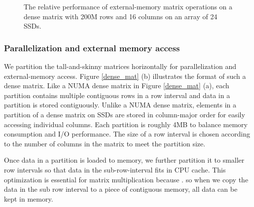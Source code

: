 \begin{figure}
	\begin{center}
		\footnotesize
		\vspace{-15pt}
		
		\vspace{-15pt}
		\caption{The relative performance of external-memory matrix operations
			on a dense matrix with 200M rows and 16 columns on an array of 24
		SSDs.}
		\label{perf:mat_ops}
	\end{center}
\end{figure}

\subsubsection{Parallelization and external memory access}
We partition the tall-and-skinny matrices horizontally for parallelization
and external-memory access. Figure \ref{dense_mat} (b) illustrates the format
of such a dense matrix. Like a NUMA dense matrix in Figure \ref{dense_mat} (a),
each partition contains multiple contiguous rows in a row interval and data
in a partition is stored contiguously. Unlike a NUMA dense matrix, elements
in a partition of a dense matrix on SSDs are stored in column-major order
for easily accessing individual columns. Each partition is roughly 4MB
 to balance memory consumption and I/O performance.
The size of a row interval is chosen according to the number of columns in
the matrix to meet the partition size.

Once data in a partition is loaded to memory, we further partition it to
smaller row intervals so that data
in the sub-row-interval fits in CPU cache.  This optimization is essential
for matrix multiplication because . so when we copy the data in
the sub row interval to a piece of contiguous memory, all data can be kept in
memory.

